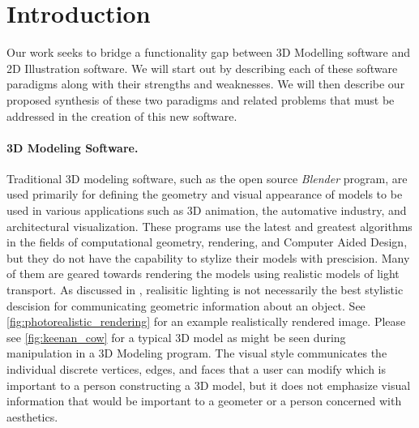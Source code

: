 \documentclass[12pt, letterpaper]{article}
\begin{document}
\newpage
\doublespacing
\tableofcontents
\newpage

\setcounter{page}{1}


\section{Introduction}

	Our work seeks to bridge a functionality gap between 3D Modelling software and 2D Illustration software. We will start out by describing each of these
	software paradigms along with their strengths and weaknesses. We will then describe our proposed synthesis of these two paradigms and related problems
	that must be addressed in the creation of this new software.


	\paragraph{3D Modeling Software.}

	Traditional 3D modeling software, such as the open source \emph{Blender} program, are used primarily for defining the geometry and visual appearance of models to be 
	used in various applications such as 3D animation, the automative industry, and architectural visualization.
	These programs use the latest and greatest algorithms in the fields of computational geometry, rendering, and Computer Aided Design,
	but they do not have the capability to stylize their models with prescision. Many of them are geared towards rendering the models using 
	realistic models of light transport. As discussed in \cite{JDA08}, realisitic lighting is not necessarily the best stylistic descision for communicating
	geometric information about an object. See \ref{fig:photorealistic_rendering} for an example realistically rendered image.
	Please see \ref{fig:keenan_cow} for a typical 3D model as might be seen during manipulation in a 3D Modeling program. The visual style communicates
	the individual discrete vertices, edges, and faces that a user can modify which is important to a person constructing a 3D model, but it does not
	emphasize visual information that would be important to a geometer or a person concerned with aesthetics.
\end{document}
